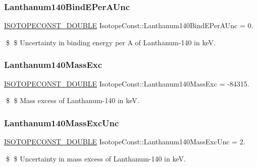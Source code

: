 \subsubsection{\texorpdfstring{Lanthanum140\+Bind\+E\+Per\+A\+Unc}{Lanthanum140BindEPerAUnc}}
{\footnotesize\ttfamily \mbox{\hyperlink{group___isotope_const-_macros_ga8f45a7272ce02c0b4c65c44636ed719a}{I\+S\+O\+T\+O\+P\+E\+C\+O\+N\+S\+T\+\_\+\+D\+O\+U\+B\+LE}} Isotope\+Const\+::\+Lanthanum140\+Bind\+E\+Per\+A\+Unc = 0.}

\$ \$ Uncertainty in binding energy per A of Lanthanum-\/140 in keV. \mbox{\label{group___isotope_const-_lanthanum-_la140_gaa18f9aed9b945005e714fafc8e7676b2}} 
\subsubsection{\texorpdfstring{Lanthanum140\+Mass\+Exc}{Lanthanum140MassExc}}
{\footnotesize\ttfamily \mbox{\hyperlink{group___isotope_const-_macros_ga8f45a7272ce02c0b4c65c44636ed719a}{I\+S\+O\+T\+O\+P\+E\+C\+O\+N\+S\+T\+\_\+\+D\+O\+U\+B\+LE}} Isotope\+Const\+::\+Lanthanum140\+Mass\+Exc = -\/84315.}

\$ \$ Mass excess of Lanthanum-\/140 in keV. \mbox{\label{group___isotope_const-_lanthanum-_la140_ga6026f3eb7a5e61f1182ff180a0fcc2fd}} 
\subsubsection{\texorpdfstring{Lanthanum140\+Mass\+Exc\+Unc}{Lanthanum140MassExcUnc}}
{\footnotesize\ttfamily \mbox{\hyperlink{group___isotope_const-_macros_ga8f45a7272ce02c0b4c65c44636ed719a}{I\+S\+O\+T\+O\+P\+E\+C\+O\+N\+S\+T\+\_\+\+D\+O\+U\+B\+LE}} Isotope\+Const\+::\+Lanthanum140\+Mass\+Exc\+Unc = 2.}

\$ \$ Uncertainty in mass excess of Lanthanum-\/140 in keV. \mbox{\label{group___isotope_const-_lanthanum-_la140_ga644c96831025513654b0e856678a8491}} 
